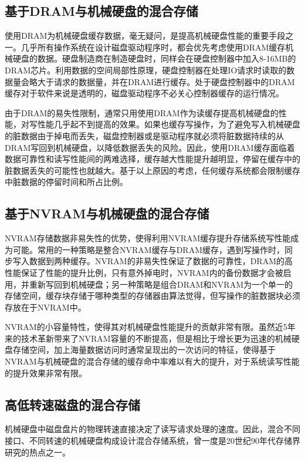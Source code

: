 \subsection{基于DRAM与机械硬盘的混合存储}

使用DRAM为机械硬盘缓存数据\cite{sdramcache2002}，毫无疑问，是提高机械硬盘性能的重要手段之一。几乎所有操作系统在设计磁盘驱动程序时，都会优先考虑使用DRAM缓存机械硬盘的数据。硬盘制造商在制造硬盘时，同样会在硬盘控制器中加入8-16MB的DRAM芯片。利用数据的空间局部性原理，硬盘控制器在处理IO请求时读取的数据量会略大于请求的数据量，并在DRAM进行缓存。处于硬盘控制器中的DRAM缓存对于软件来说是透明的，磁盘驱动程序不必关心控制器缓存的运行情况。

由于DRAM的易失性限制，通常只用使用DRAM作为读缓存提高机械硬盘的性能，对写性能几乎起不到提高的效果。如果也缓存写操作，为了避免写入机械硬盘的脏数据由于掉电而丢失，磁盘控制器或是驱动程序就必须将脏数据持续的从DRAM写回到机械硬盘，以降低数据丢失的风险。因此，使用DRAM缓存面临着数据可靠性和读写性能间的两难选择，缓存越大性能提升越明显，停留在缓存中的脏数据丢失的可能性也就越大。基于以上原因的考虑，任何缓存系统都会限制缓存中脏数据的停留时间和所占比例。

\subsection{基于NVRAM与机械硬盘的混合存储}

NVRAM存储数据非易失性的优势，使得利用NVRAM缓存提升存储系统写性能成为可能。常用的一种策略是整合NVRAM缓存与DRAM缓存\cite{nvramcache2013}，遇到写操作时，同步写入数据到两种缓存。NVRAM的非易失性保证了数据的可靠性，DRAM的高性能保证了性能的提升比例，只有意外掉电时，NVRAM内的备份数据才会被启用，并重新写回到机械硬盘；另一种策略是组合DRAM和NVRAM为一个单一的存储空间，缓存块存储于哪种类型的存储器由算法觉得，但写操作的脏数据块必须存放在于NVRAM中。

NVRAM的小容量特性，使得其对机械硬盘性能提升的贡献非常有限。虽然近5年来的技术革新带来了NVRAM容量的不断提高，但是相比于增长更为迅速的机械硬盘存储空间，加上海量数据访问时通常呈现出的一次访问的特征，使得基于NVRAM与机械硬盘的混合存储的缓存命中率难以有大的提升，对于系统读写性能的提升效果非常有限。

\subsection{高低转速磁盘的混合存储}

机械硬盘中磁盘盘片的物理转速直接决定了读写请求处理的速度。因此，混合不同接口、不同转速的机械硬盘构成设计混合存储系统，曾一度是20世纪90年代存储界研究的热点之一。

